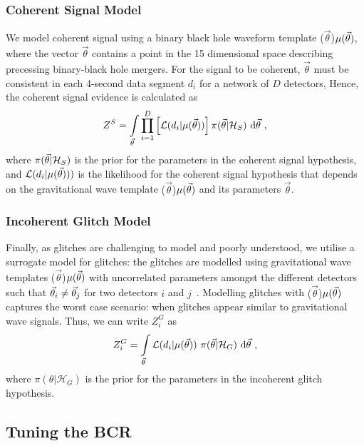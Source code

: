 \documentclass[%
 nofootinbib,
 amsmath,amssymb,
 aps,
 twocolumn
]{revtex4-2}
\newcommand{\mathcmd}[1]{{\sc \relax\ifmmode#1\else $#1$\fi}\xspace}
\newcommand{\parameters}{\mathcmd{\vec{\theta}}}
\newcommand{\template}{\mathcmd{\mu(\parameters)}}
\begin{document}
\subsubsection{Coherent Signal Model}
We model coherent signal using a binary black hole waveform template \template, where the vector \parameters contains a point in the 15 dimensional space describing precessing binary-black hole mergers. For the signal to be coherent, \parameters must be consistent in each 4-second data segment $d_i$ for a network of $D$ detectors, Hence, the coherent signal evidence is calculated as
\begin{equation}
\label{eq:zs}
Z^S = \int\limits_{\parameters} \prod\limits^{D}_{i=1} \left[ \mathcal{L}(d_i|\template)\right] \pi(\parameters | \mathcal{H}_S)\  \text{d}\parameters \ ,
\end{equation}
where $\pi(\parameters| \mathcal{H}_S)$ is the prior for the parameters in the coherent signal hypothesis, and $\mathcal{L}(d_i|\template))$ is the likelihood for the coherent signal hypothesis that depends on the gravitational wave template \template and its parameters \parameters. 

\subsubsection{Incoherent Glitch Model}
Finally, as glitches are challenging to model and poorly understood, we utilise a surrogate model for glitches: the glitches are modelled using gravitational wave templates  \template with uncorrelated  parameters amongst the different detectors such that  $\parameters_i \neq \parameters_j$ for two detectors $i$ and $j$~\cite{bci}.  Modelling glitches with \template captures the worst case scenario: when glitches appear similar to gravitational wave signals. Thus, we can write $Z^G_i$ as 
\begin{equation}
\label{eq:zg}
Z^G_i = \int\limits_{\parameters} \mathcal{L}(d_i|\template)\ \pi(\parameters| \mathcal{H}_G)\  \text{d}\parameters  \ ,
\end{equation}
where $\pi(\theta| \mathcal{H}_G)$ is the prior for the parameters in the incoherent glitch hypothesis. 

\subsection{Tuning the BCR}
\end{document}

